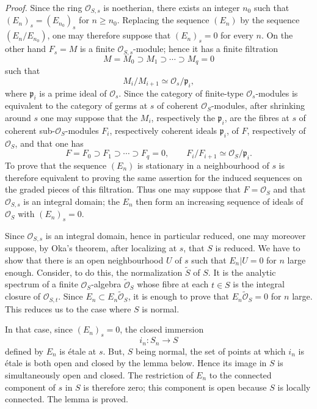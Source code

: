 \emph{Proof.} Since the ring $\mathcal O_{S,s}$ is noetherian, there exists an integer $n_0$ such that $(E_n)_s=(E_{n_0})_s$ for $n\geq n_0$. Replacing the sequence $(E_n)$ by the sequence $(E_n/E_{n_0})$, one may therefore suppose that $(E_n)_s=0$ for every $n$. On the other hand $F_s=M$ is a finite $\mathcal O_{S,s}$-module; hence it has a finite filtration
\[
 M=M_0\supset M_1\supset\cdots\supset M_q=0
\]
such that
\[
 M_i/M_{i+1}\simeq \mathcal O_s/\mathfrak p_i,
\]
where $\mathfrak p_i$ is a prime ideal of $\mathcal O_s$. Since the category of finite-type $\mathcal O_s$-modules is equivalent to the category of germs at $s$ of coherent $\mathcal O_S$-modules, after shrinking around $s$ one may suppose that the $M_i$, respectively the $\mathfrak p_i$, are the fibres at $s$ of coherent sub-$\mathcal O_S$-modules $F_i$, respectively coherent ideals $\mathfrak p_i$, of $F$, respectively of $\mathcal O_S$, and that one has
\[
 F=F_0\supset F_1\supset\cdots\supset F_q=0,
 \qquad F_i/F_{i+1}\simeq\mathcal O_S/\mathfrak p_i.
\]
To prove that the sequence $(E_n)$ is stationary in a neighbourhood of $s$ is therefore equivalent to proving the same assertion for the induced sequences on the graded pieces of this filtration. Thus one may suppose that $F=\mathcal O_S$ and that $\mathcal O_{S,s}$ is an integral domain; the $E_n$ then form an increasing sequence of ideals of $\mathcal O_S$ with $(E_n)_s=0$.

Since $\mathcal O_{S,s}$ is an integral domain, hence in particular reduced, one may moreover suppose, by Oka's theorem, after localizing at $s$, that $S$ is reduced. We have to show that there is an open neighbourhood $U$ of $s$ such that $E_n|U=0$ for $n$ large enough. Consider, to do this, the normalization $\widetilde S$ of $S$. It is the analytic spectrum of a finite $\mathcal O_S$-algebra $\widetilde{\mathcal O}_S$ whose fibre at each $t\in S$ is the integral closure of $\mathcal O_{S,t}$. Since $E_n\subset E_n\widetilde{\mathcal O}_S$, it is enough to prove that $E_n\widetilde{\mathcal O}_S=0$ for $n$ large. This reduces us to the case where $S$ is normal.

In that case, since $(E_n)_s=0$, the closed immersion
\[
 i_n:S_n\longrightarrow S
\]
defined by $E_n$ is étale at $s$. But, $S$ being normal, the set of points at which $i_n$ is étale is both open and closed by the lemma below. Hence its image in $S$ is simultaneously open and closed. The restriction of $E_n$ to the connected component of $s$ in $S$ is therefore zero; this component is open because $S$ is locally connected. The lemma is proved.

